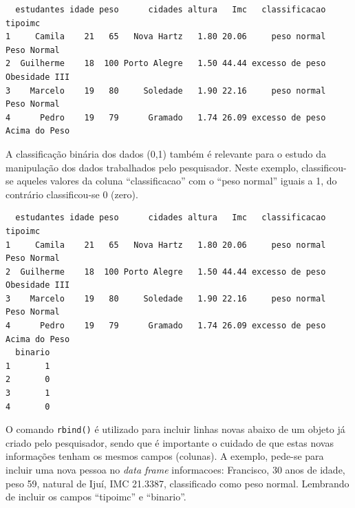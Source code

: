 \documentclass[12pt,brazil,oneside]{book}
\newenvironment{Shaded}{\begin{snugshade}}{\end{snugshade}}
\newcommand{\CommentTok}[1]{\textcolor[rgb]{0.56,0.35,0.01}{\textit{#1}}}
\newcommand{\DecValTok}[1]{\textcolor[rgb]{0.00,0.00,0.81}{#1}}
\newcommand{\KeywordTok}[1]{\textcolor[rgb]{0.13,0.29,0.53}{\textbf{#1}}}
\newcommand{\NormalTok}[1]{#1}
\newcommand{\OperatorTok}[1]{\textcolor[rgb]{0.81,0.36,0.00}{\textbf{#1}}}
\newcommand{\StringTok}[1]{\textcolor[rgb]{0.31,0.60,0.02}{#1}}
\begin{document}
\begin{verbatim}
  estudantes idade peso      cidades altura   Imc   classificacao       tipoimc
1     Camila    21   65   Nova Hartz   1.80 20.06     peso normal   Peso Normal
2  Guilherme    18  100 Porto Alegre   1.50 44.44 excesso de peso Obesidade III
3    Marcelo    19   80     Soledade   1.90 22.16     peso normal   Peso Normal
4      Pedro    19   79      Gramado   1.74 26.09 excesso de peso Acima do Peso
\end{verbatim}

A classificação binária dos dados (0,1) também é relevante para o estudo
da manipulação dos dados trabalhados pelo pesquisador. Neste exemplo,
classificou-se aqueles valores da coluna ``classificacao'' com o ``peso
normal'' iguais a 1, do contrário classificou-se 0 (zero).

\begin{Shaded}
\end{Shaded}

\begin{verbatim}
  estudantes idade peso      cidades altura   Imc   classificacao       tipoimc
1     Camila    21   65   Nova Hartz   1.80 20.06     peso normal   Peso Normal
2  Guilherme    18  100 Porto Alegre   1.50 44.44 excesso de peso Obesidade III
3    Marcelo    19   80     Soledade   1.90 22.16     peso normal   Peso Normal
4      Pedro    19   79      Gramado   1.74 26.09 excesso de peso Acima do Peso
  binario
1       1
2       0
3       1
4       0
\end{verbatim}

O comando \texttt{rbind()} é utilizado para incluir linhas novas abaixo
de um objeto já criado pelo pesquisador, sendo que é importante o
cuidado de que estas novas informações tenham os mesmos campos
(colunas). A exemplo, pede-se para incluir uma nova pessoa no \emph{data
frame} informacoes: Francisco, 30 anos de idade, peso 59, natural de
Ijuí, IMC 21.3387, classificado como peso normal. Lembrando de incluir
os campos ``tipoimc'' e ``binario''.
\end{document}
